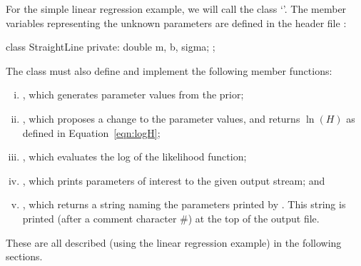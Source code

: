\documentclass[article]{jss}
\begin{document}
For the simple linear regression example, we will call the class
`'. The member variables representing the
unknown parameters are defined in the header file :
%
\begin{CodeChunk}
\begin{CodeInput}
class StraightLine
{
    private:
        double m, b, sigma;
};
\end{CodeInput}
\end{CodeChunk}
%
The class must also define and implement the following member functions:
\begin{enumerate}[(i)]
\item {}, which generates parameter
        values from the prior;
\item {}, which proposes a
        change to the parameter values, and returns $\ln(H)$ as defined in
        Equation~\ref{eqn:logH};
\item {}, which evaluates the log of
        the likelihood function;
\item {}, which prints parameters of
        interest to the given output stream; and
\item {}, which returns a 
        string naming the parameters printed by .
        This string is printed (after a comment character \#) at the top of
        the output file.
\end{enumerate}
These are all described (using the linear regression example) in the
following sections.




\end{document}

